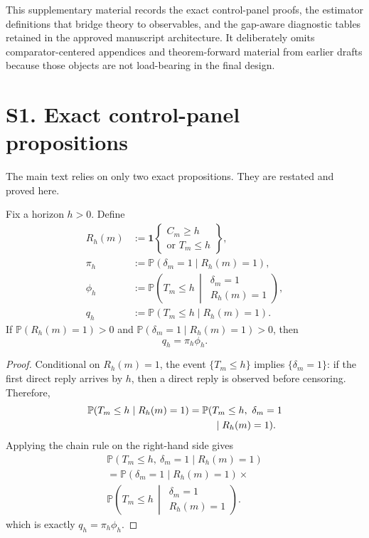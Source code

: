 \noindent This supplementary material records the exact control-panel proofs,
the estimator definitions that bridge theory to observables, and the gap-aware
diagnostic tables retained in the approved manuscript architecture. It
deliberately omits comparator-centered appendices and theorem-forward material
from earlier drafts because those objects are not load-bearing in the final
design.

\section*{S1. Exact control-panel propositions}
\SupplementTheoryOnlyNote

The main text relies on only two exact propositions. They are restated and
proved here.

\begin{proposition}
Fix a horizon \(h>0\). Define
\[
\begin{aligned}
R_h(m)
&:=\mathbf{1}\!\left\{\substack{C_m\ge h\\ \text{or } T_m\le h}\right\},\\
\pi_h
&:=\mathbb{P}(\delta_m=1\mid R_h(m)=1),\\
\phi_h
&:=\mathbb{P}\!\left(T_m\le h \,\middle|\, \substack{\delta_m=1\\ R_h(m)=1}\right),\\
q_h
&:=\mathbb{P}(T_m\le h \mid R_h(m)=1).
\end{aligned}
\]
If \(\mathbb{P}(R_h(m)=1)>0\) and
\(\mathbb{P}(\delta_m=1\mid R_h(m)=1)>0\), then
\[
q_h=\pi_h\phi_h.
\]
\end{proposition}

\begin{proof}
Conditional on \(R_h(m)=1\), the event \(\{T_m\le h\}\) implies
\(\{\delta_m=1\}\): if the first direct reply arrives by \(h\), then a direct
reply is observed before censoring. Therefore,
\begin{align*}
\mathbb{P}(T_m\le h\mid R_h(m)=1)
&=
\mathbb{P}(T_m\le h,\ \delta_m=1 \\
&\hspace{2.5em}\mid R_h(m)=1).
\end{align*}
Applying the chain rule on the right-hand side gives
\begin{gather*}
\mathbb{P}(T_m\le h,\ \delta_m=1\mid R_h(m)=1)\\
=\mathbb{P}(\delta_m=1\mid R_h(m)=1)\times \\
\mathbb{P}\!\left(T_m\le h \,\middle|\, \substack{\delta_m=1\\ R_h(m)=1}\right).
\end{gather*}
which is exactly \(q_h=\pi_h\phi_h\).
\end{proof}

